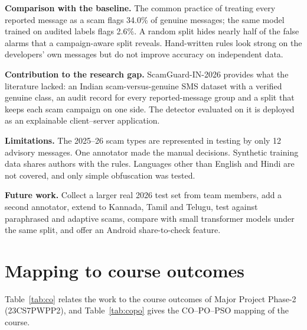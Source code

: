 \documentclass[12pt,a4paper]{report}
\begin{document}
\textbf{Comparison with the baseline.} The common practice of treating every reported message as a scam flags 34.0\% of genuine messages; the same model trained on audited labels flags 2.6\%. A random split hides nearly half of the false alarms that a campaign-aware split reveals. Hand-written rules look strong on the developers' own messages but do not improve accuracy on independent data.

\textbf{Contribution to the research gap.} ScamGuard-IN-2026 provides what the literature lacked: an Indian scam-versus-genuine SMS dataset with a verified genuine class, an audit record for every reported-message group and a split that keeps each scam campaign on one side. The detector evaluated on it is deployed as an explainable client--server application.

\textbf{Limitations.} The 2025--26 scam types are represented in testing by only 12 advisory messages. One annotator made the manual decisions. Synthetic training data shares authors with the rules. Languages other than English and Hindi are not covered, and only simple obfuscation was tested.

\textbf{Future work.} Collect a larger real 2026 test set from team members, add a second annotator, extend to Kannada, Tamil and Telugu, test against paraphrased and adaptive scams, compare with small transformer models under the same split, and offer an Android share-to-check feature.

\section{Mapping to course outcomes}
Table~\ref{tab:co} relates the work to the course outcomes of Major Project Phase-2 (23CS7PWPP2), and Table~\ref{tab:copo} gives the CO--PO--PSO mapping of the course.
\end{document}
